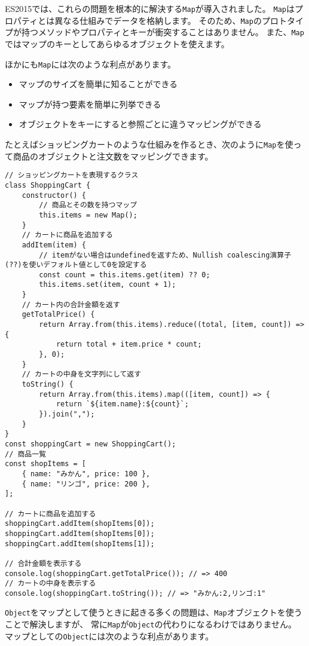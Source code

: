 ES2015では、これらの問題を根本的に解決する\texttt{Map}が導入されました。
\texttt{Map}はプロパティとは異なる仕組みでデータを格納します。
そのため、\texttt{Map}のプロトタイプが持つメソッドやプロパティとキーが衝突することはありません。
また、\texttt{Map}ではマップのキーとしてあらゆるオブジェクトを使えます。

ほかにも\texttt{Map}には次のような利点があります。

\begin{itemize}
\item
  マップのサイズを簡単に知ることができる
\item
  マップが持つ要素を簡単に列挙できる
\item
  オブジェクトをキーにすると参照ごとに違うマッピングができる
\end{itemize}

たとえばショッピングカートのような仕組みを作るとき、次のように\texttt{Map}を使って商品のオブジェクトと注文数をマッピングできます。

\begin{lstlisting}
// ショッピングカートを表現するクラス
class ShoppingCart {
    constructor() {
        // 商品とその数を持つマップ
        this.items = new Map();
    }
    // カートに商品を追加する
    addItem(item) {
        // itemがない場合はundefinedを返すため、Nullish coalescing演算子(??)を使いデフォルト値として0を設定する
        const count = this.items.get(item) ?? 0;
        this.items.set(item, count + 1);
    }
    // カート内の合計金額を返す
    getTotalPrice() {
        return Array.from(this.items).reduce((total, [item, count]) => {
            return total + item.price * count;
        }, 0);
    }
    // カートの中身を文字列にして返す
    toString() {
        return Array.from(this.items).map(([item, count]) => {
            return `${item.name}:${count}`;
        }).join(",");
    }
}
const shoppingCart = new ShoppingCart();
// 商品一覧
const shopItems = [
    { name: "みかん", price: 100 },
    { name: "リンゴ", price: 200 },
];

// カートに商品を追加する
shoppingCart.addItem(shopItems[0]);
shoppingCart.addItem(shopItems[0]);
shoppingCart.addItem(shopItems[1]);

// 合計金額を表示する
console.log(shoppingCart.getTotalPrice()); // => 400
// カートの中身を表示する
console.log(shoppingCart.toString()); // => "みかん:2,リンゴ:1"
\end{lstlisting}

\texttt{Object}をマップとして使うときに起きる多くの問題は、\texttt{Map}オブジェクトを使うことで解決しますが、
常に\texttt{Map}が\texttt{Object}の代わりになるわけではありません。
マップとしての\texttt{Object}には次のような利点があります。

